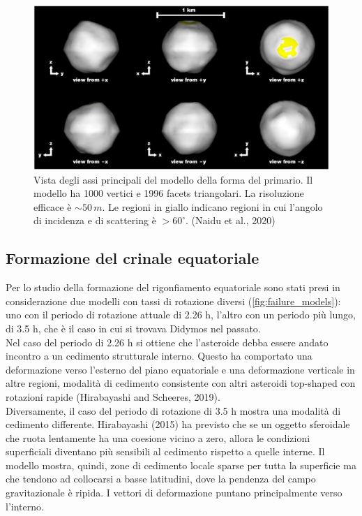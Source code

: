 \documentclass[a4paper,11pt,openright]{book}
\begin{document}
\begin{figure}
    \centering
    \includegraphics[scale=0.78]{figure/didymos_shape_model.jpg}
    \caption[Vista degli assi principali del modello della forma del primario.]{Vista degli assi principali del modello della forma del primario. Il modello ha 1000 vertici e 1996 facets triangolari. La risoluzione efficace è $\sim 50\,m$. Le regioni in giallo indicano regioni in cui l'angolo di incidenza e di scattering è $>60^\circ$. (Naidu et al., 2020)}
    \label{fig:didymos_shape_model}
\end{figure}

\subsection{Formazione del crinale equatoriale}
Per lo studio della formazione del rigonfiamento equatoriale sono stati presi in considerazione due modelli con tassi di rotazione diversi (\cref{fig:failure_models}): uno con il periodo di rotazione attuale di 2.26 h, l'altro con un periodo più lungo, di 3.5 h, che è il caso in cui si trovava Didymos nel passato.\\
Nel caso del periodo di 2.26 h si ottiene che l'asteroide debba essere andato incontro a un cedimento strutturale interno. Questo ha comportato una deformazione verso l'esterno del piano equatoriale e una deformazione verticale in altre regioni, modalità di cedimento consistente con altri asteroidi top-shaped con rotazioni rapide (Hirabayashi and Scheeres, 2019).\\
Diversamente, il caso del periodo di rotazione di 3.5 h mostra una modalità di cedimento differente. Hirabayashi (2015) ha previsto che se un oggetto sferoidale che ruota lentamente ha una coesione vicino a zero, allora le condizioni superficiali diventano più sensibili al cedimento rispetto a quelle interne. Il modello mostra, quindi, zone di cedimento locale sparse per tutta la superficie ma che tendono ad collocarsi a basse latitudini, dove la pendenza del campo gravitazionale è ripida. I vettori di deformazione puntano principalmente verso l'interno.
\end{document}
